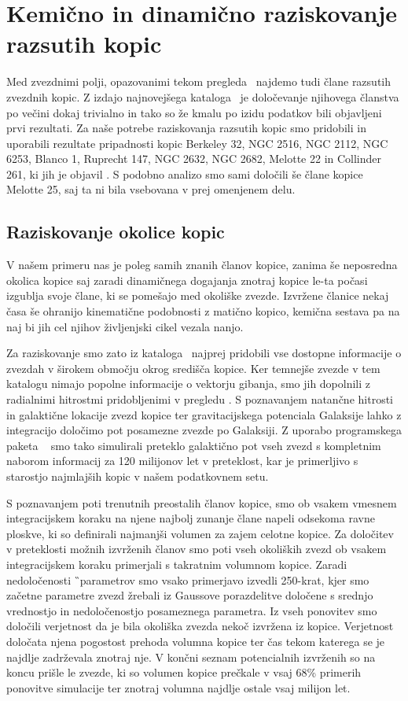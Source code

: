 \section{Kemično in dinamično raziskovanje razsutih kopic}
\label{sec:slo_kopice_taziskovanje}
Med zvezdnimi polji, opazovanimi tekom pregleda \Gh\ najdemo tudi člane razsutih zvezdnih kopic. Z izdajo najnovejšega kataloga \Gs\ je določevanje njihovega članstva po večini dokaj trivialno in tako so že kmalu po izidu podatkov bili objavljeni prvi rezultati. Za naše potrebe raziskovanja razsutih kopic smo pridobili in uporabili rezultate pripadnosti kopic Berkeley 32, NGC 2516, NGC 2112, NGC 6253, Blanco 1, Ruprecht 147, NGC 2632, NGC 2682,  Melotte 22 in Collinder 261, ki jih je objavil \citet{2018A&A...618A..93C}. S podobno analizo smo sami določili še člane kopice Melotte 25, saj ta ni bila vsebovana v prej omenjenem delu.

\subsection{Raziskovanje okolice kopic}
V našem primeru nas je poleg samih znanih članov kopice, zanima še neposredna okolica kopice saj zaradi dinamičnega dogajanja znotraj kopice le-ta počasi izgublja svoje člane, ki se pomešajo med okoliške zvezde. Izvržene članice nekaj časa še ohranijo kinematične podobnosti z matično kopico, kemična sestava pa na naj bi jih cel njihov življenjski cikel vezala nanjo. 

Za raziskovanje smo zato iz kataloga \Gs\ najprej pridobili vse dostopne informacije o zvezdah v širokem območju okrog središča kopice. Ker temnejše zvezde v tem katalogu nimajo popolne informacije o vektorju gibanja, smo jih dopolnili z radialnimi hitrostmi pridobljenimi v pregledu \Gh. S poznavanjem natančne hitrosti in galaktične lokacije zvezd kopice ter gravitacijskega potenciala Galaksije lahko z integracijo določimo pot posamezne zvezde po Galaksiji. Z uporabo programskega paketa \GP\ \cite{2015ApJS..216...29B} smo tako simulirali preteklo galaktično pot vseh zvezd s kompletnim naborom informacij za 120 milijonov let v preteklost, kar je primerljivo s starostjo najmlajših kopic v našem podatkovnem setu.

S poznavanjem poti trenutnih preostalih članov kopice, smo ob vsakem vmesnem integracijskem koraku na njene najbolj zunanje člane napeli odsekoma ravne ploskve, ki so definirali najmanjši volumen za zajem celotne kopice. Za določitev v preteklosti možnih izvrženih članov smo poti vseh okoliških zvezd ob vsakem integracijskem koraku primerjali s takratnim volumnom kopice. Zaradi nedoločenosti \G\ parametrov smo vsako primerjavo izvedli 250-krat, kjer smo začetne parametre zvezd žrebali iz Gaussove porazdelitve določene s srednjo vrednostjo in nedoločenostjo posameznega parametra. Iz vseh ponovitev smo določili verjetnost da je bila okoliška zvezda nekoč izvržena iz kopice. Verjetnost določata njena pogostost prehoda volumna kopice ter čas tekom katerega se je najdlje zadrževala znotraj nje. V končni seznam potencialnih izvrženih so na koncu prišle le zvezde, ki so volumen kopice prečkale v vsaj $68$\% primerih ponovitve simulacije ter znotraj volumna najdlje ostale vsaj milijon let.

